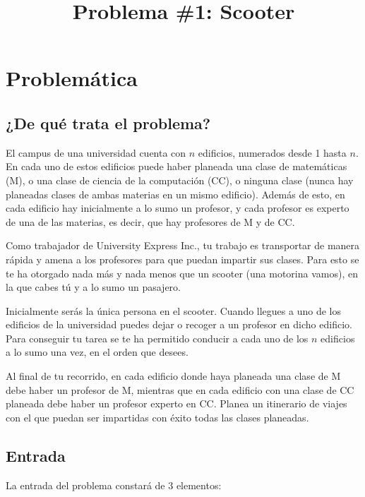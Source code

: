 \documentclass[11pt]{article}
\title{Problema \#1: Scooter}
\begin{document}
    \maketitle
    \newpage

    \tableofcontents
    \newpage

    \section{Problemática}
    \subsection{¿De qué trata el problema?}
    El campus de una universidad cuenta con $n$ edificios, numerados desde 1 hasta $n$. En cada uno de estos
    edificios puede haber planeada una clase de matemáticas (M), o una clase de ciencia de la computación (CC), 
    o ninguna clase (nunca hay planeadas clases de ambas materias en un mismo edificio). Además de esto, en 
    cada edificio hay inicialmente a lo sumo un profesor, y cada profesor es experto de una de las materias, es 
    decir, que hay profesores de M y de CC.
    
    Como trabajador de University Express Inc., tu trabajo es transportar de manera rápida y amena a los
    profesores para que puedan impartir sus clases. Para esto se te ha otorgado nada más y nada menos que un
    scooter (una motorina vamos), en la que cabes tú y a lo sumo un pasajero.
    
    Inicialmente serás la única persona en el scooter. Cuando llegues a uno de los edificios de la universidad
    puedes dejar o recoger a un profesor en dicho edificio. Para conseguir tu tarea se te ha permitido conducir
    a cada uno de los $n$ edificios a lo sumo una vez, en el orden que desees.

    Al final de tu recorrido, en cada edificio donde haya planeada una clase de M debe haber un profesor de M, 
    mientras que en cada edificio con una clase de CC planeada debe haber un profesor experto en CC. Planea un 
    itinerario de viajes con el que puedan ser impartidas con éxito todas las clases planeadas.

    \subsection{Entrada}
    La entrada del problema constará de 3 elementos:
\end{document}
